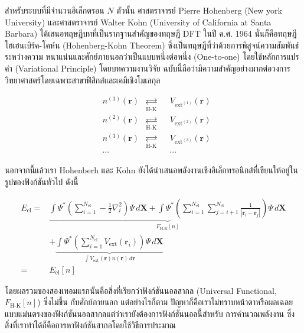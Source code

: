 สำหรับระบบที่มีจำนวนอิเล็กตรอน $N$ ตัวนั้น ศาสตราจารย์ Pierre Hohenberg (New york University) และศาสตราจารย์ Walter Kohn 
(University of California at Santa Barbara) ได้เสนอทฤษฎีบทที่เป็นรากฐานสำคัญของทฤษฎี DFT ในปี ค.ศ. 1964 นั่นก็คือทฤษฎี%
โฮเฮนเบิร์ค-โคห์น (Hohenberg-Kohn Theorem)\autocite{hohenberg1964} ซึ่งเป็นทฤษฎีที่ว่าด้วยการพิสูจน์ความสัมพันธ์ระหว่างความ%
หนาแน่นและศักย์ภายนอกว่าเป็นแบบหนึ่งต่อหนึ่ง (One-to-one) โดยใช้หลักการแปรค่า (Variational Principle) โดยบทความงานวิจัย%
ฉบับนี้ถือว่ามีความสำคัญอย่างมากต่อวงการวิทยาศาสตร์โดยเฉพาะสาขาฟิสิกส์และเคมีเชิงโมเลกุล

\begin{framed}
    \centering
    \begin{align*}
        &n^{(1)}(\bm{r}) &\underset{\text{H-K}}{\rightleftarrows} &&V_{\text{ext}^{(1)}}(\bm{r}) \\[0.5ex]
        &n^{(2)}(\bm{r}) &\underset{\text{H-K}}{\rightleftarrows} &&V_{\text{ext}^{(2)}}(\bm{r}) \\[0.5ex]
        &n^{(3)}(\bm{r}) &\underset{\text{H-K}}{\rightleftarrows} &&V_{\text{ext}^{(3)}}(\bm{r}) \\[0.5ex]
        &\cdots & &&\cdots 
    \end{align*}
\end{framed}

นอกจากนี้แล้วเรา Hohenberh และ Kohn ยังได้นำเสนอพลังงานเชิงอิเล็กทรอนิกส์ที่เขียนให้อยู่ในรูปของฟังก์ชันทั่วไป ดังนี้

\begin{align}\label{eq:ener_univer_ext_pot}
    E_{\text{el}} =& \underbrace{\int \Psi^{\ast} 
    \left ( \sum^{N_{\text{el}}}_{i=1} -\frac{1}{2} \nabla^{2}_{i} \right ) 
    \Psi \, d\bm{X} 
    + \int \Psi^{\ast} 
    \left ( \sum^{N_{\text{el}}}_{i=1} \sum^{N_{\text{el}}}_{j=i+1} \frac{1}{|\bm{r}_{i}-\bm{r}_{j}|} \right ) 
    \Psi \, d\bm{X}}_{\textstyle F_{\text{H-K}}[n]} \nonumber \\
    &+ \underbrace{\int \Psi^{\ast}  
    \left ( \sum^{N_{\text{el}}}_{i=1} V_{\text{ext}}(\bm{r}_{i}) \right ) 
    \Psi \, d\bm{X}%
    }_{\textstyle \int V_{\text{ext}}(\bm{r}) n(\bm{r}) \, d\bm{r}} \\
    =& E_{\text{el}}[n]
\end{align}

\noindent โดยผลรวมของสองเทอมแรกนั้นคือสิ่งที่เรียกว่าฟังก์ชันนอลสากล (Universal Functional, $F_{\text{H-K}}[n]$) ซึ่งไม่ขึ้น%
กับศักย์ภายนอก แต่อย่างไรก็ตาม ปัญหาก็คือเราไม่ทราบหน้าตาหรือผลเฉลยแบบแม่นตรงของฟังก์ชันนอลสากลแต่ว่าเรายังต้องการฟังก์ชันนอลนี้สำหรับ%
การคำนวณพลังงาน ซึ่งสิ่งที่เราทำได้ก็คือการหาฟังก์ชันสากลโดยใช้วิธีการประมาณ

